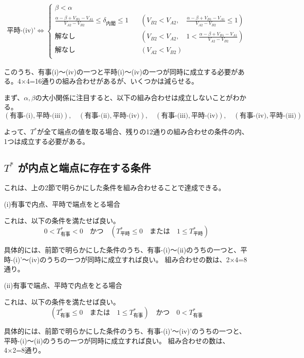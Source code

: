 \documentclass[main.tex]{subfiles}
\begin{document}
\begin{align*}
    \text{平時-(iv)'} \Leftrightarrow 
    \begin{cases}
        \beta < \alpha \\[1em]
        \frac{\alpha-\beta + V_{B1}-V_{A1}}{V_{A2} - V_{B2}} \le \delta_{内閣} \le 1  \quad &( V_{B2} < V_{A2} ,\quad \frac{\alpha-\beta + V_{B1}-V_{A1}}{V_{A2} - V_{B2}} \le 1) \\[1em]
        解なし  \quad &( V_{B2} < V_{A2} ,\quad 1 < \frac{\alpha-\beta + V_{B1}-V_{A1}}{V_{A2} - V_{B2}}) \\[1em]
        解なし \quad &( V_{A2} < V_{B2} )\\[1em]
    \end{cases}
\end{align*}


このうち、有事(i)〜(iv)の一つと平時(i)〜(iv)の一つが同時に成立する必要がある。4×4=16通りの組み合わせがあるが、いくつかは減らせる。

まず、$\alpha, \beta$の大小関係に注目すると、以下の組み合わせは成立しないことがわかる。
$$(\text{有事-(i)}, \text{平時-(iii)}),\quad (\text{有事-(ii)}, \text{平時-(iv)}),\quad (\text{有事-(iii)}, \text{平時-(iv)}),\quad (\text{有事-(iv)}, \text{平時-(iii)})$$

よって、$T^*$が全て端点の値を取る場合、残りの12通りの組み合わせの条件の内、1つは成立する必要がある。





\subsection{$T^*$ が内点と端点に存在する条件}

これは、上の2節で明らかにした条件を組み合わせることで達成できる。

(i)有事で内点、平時で端点をとる場合

これは、以下の条件を満たせば良い。
$$0 < T^*_{有事} < 0 \quad\text{かつ}\quad (T^*_{平時} \le 0 \quad{または}\quad 1 \le T^*_{平時})$$

具体的には、前節で明らかにした条件のうち、有事-(i)〜(ii)のうちの一つと、平時-(i)'〜(iv)のうちの一つが同時に成立すれば良い。
組み合わせの数は、2×4=8通り。


\bigskip
(ii)有事で端点、平時で内点をとる場合

これは、以下の条件を満たせば良い。
$$(T^*_{有事} \le 0 \quad{または}\quad 1 \le T^*_{有事}) \quad\text{かつ}\quad 0 < T^*_{有事}$$

具体的には、前節で明らかにした条件のうち、有事-(i)'〜(iv)'のうちの一つと、平時-(i)〜(ii)のうちの一つが同時に成立すれば良い。
組み合わせの数は、4×2=8通り。



\theendnotes %
\end{document}
